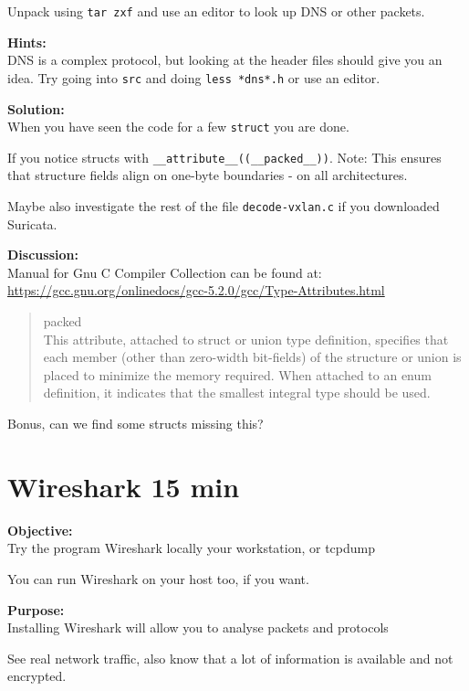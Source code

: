 \documentclass[a4paper,11pt,notitlepage]{report}
\begin{document}
Unpack using \verb+tar zxf+ and use an editor to look up DNS or other packets.

{\bf Hints:}\\
DNS is a complex protocol, but looking at the header files should give you an idea. Try going into \verb+src+ and doing \verb+less *dns*.h+ or use an editor.


{\bf Solution:}\\
When you have seen the code for a few \verb+struct+ you are done.

If you notice structs with \verb+__attribute__((__packed__))+. Note: This ensures that structure fields align on one-byte boundaries - on all architectures.

Maybe also investigate the rest of the file \verb+decode-vxlan.c+ if you downloaded Suricata.

{\bf Discussion:}\\
Manual for Gnu C Compiler Collection can be found at:\\
\url{https://gcc.gnu.org/onlinedocs/gcc-5.2.0/gcc/Type-Attributes.html}


\begin{quote}
packed\\
This attribute, attached to struct or union type definition, specifies that each member (other than zero-width bit-fields) of the structure or union is placed to minimize the memory required. When attached to an enum definition, it indicates that the smallest integral type should be used.
\end{quote}

Bonus, can we find some structs missing this?



\chapter{Wireshark 15 min}
\label{ex:wireshark-install}



{\bf Objective:}\\
Try the program Wireshark locally your workstation, or tcpdump

You can run Wireshark on your host too, if you want.

{\bf Purpose:}\\
Installing Wireshark will allow you to analyse packets and protocols

See real network traffic, also know that a lot of information is available and not encrypted.
\end{document}
